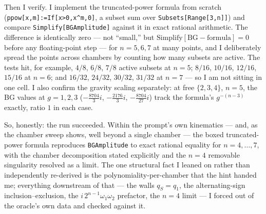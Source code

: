 \documentclass{article}
\begin{document}
Then I verify. I implement the truncated-power formula from scratch
(\texttt{ppow[x,m]:=If[x>0,x\^{}m,0]}, a subset sum over \texttt{Subsets[Range[3,n]]})
and compare \texttt{Simplify[BGAmplitude]} against it in exact rational
arithmetic. The difference is identically zero --- not ``small,'' but
$\mathrm{Simplify}[\text{BG}-\text{formula}]=0$ before any floating-point step ---
for $n=5,6,7$ at many points, and I deliberately spread the points across
chambers by counting how many subsets are active. The tests hit, for example,
$4/8$, $6/8$, $7/8$ active subsets at $n=5$; $8/16$, $10/16$, $12/16$, $15/16$ at
$n=6$; and $16/32$, $24/32$, $30/32$, $31/32$ at $n=7$ --- so I am not sitting in
one cell. I also confirm the gravity scaling separately: at free $\{2,3,4\}$,
$n=5$, the BG values at $g=1,2,3$ ($-\tfrac{8704}{3}i$, $-\tfrac{2176}{3}i$,
$-\tfrac{8704}{27}i$) track the formula's $g^{-(n-3)}$ exactly, ratio $1$ in each
case.

So, honestly: the run succeeded. Within the prompt's own kinematics --- and, as
the chamber sweep shows, well beyond a single chamber --- the boxed
truncated-power formula reproduces \texttt{BGAmplitude} to exact rational equality
for $n=4,\dots,7$, with the chamber decomposition stated explicitly and the $n=4$
removable singularity resolved as a limit. The one structural fact I leaned on
rather than independently re-derived is the polynomiality-per-chamber that the
hint handed me; everything downstream of that --- the walls $q_S=q_1$, the
alternating-sign inclusion--exclusion, the $i\,2^{n-1}\omega_1\omega_2$
prefactor, the $n=4$ limit --- I forced out of the oracle's own data and checked
against it.
\end{document}
